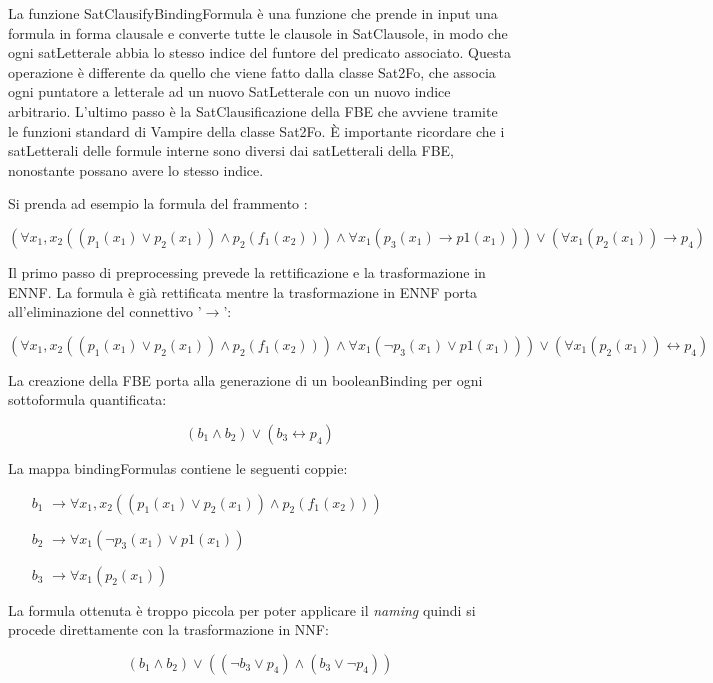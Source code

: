 \documentclass[./main.tex]{subfiles}
\begin{document}
La funzione SatClausifyBindingFormula è una funzione che prende in input una formula
in forma clausale e converte tutte le clausole in SatClausole, in modo che ogni satLetterale abbia lo stesso indice del funtore del predicato associato.
Questa operazione è differente da quello che viene fatto dalla classe Sat2Fo, che associa ogni puntatore a letterale ad un nuovo SatLetterale con un nuovo indice arbitrario.
L'ultimo passo è la SatClausificazione della FBE che avviene tramite le funzioni standard di Vampire della classe Sat2Fo.
È importante ricordare che i satLetterali delle formule interne sono diversi dai satLetterali della FBE, nonostante possano avere
lo stesso indice.

Si prenda ad esempio la formula del frammento \cb:

$$ (\forall x_1, x_2 ((p_1(x_1) \lor p_2(x_1)) \land p_2(f_1(x_2))) 
\land  \forall x_1 (p_3(x_1) \rightarrow p1(x_1)))  
\lor (\forall x_1(p_2(x_1)) \rightarrow p_4)
$$

Il primo passo di preprocessing prevede la rettificazione e la trasformazione in ENNF.
La formula è già rettificata mentre la trasformazione in ENNF porta all'eliminazione del connettivo '$\rightarrow$':

$$ (\forall x_1, x_2 ((p_1(x_1) \lor p_2(x_1)) \land p_2(f_1(x_2))) 
\land  \forall x_1 (\lnot p_3(x_1) \lor p1(x_1)))  
\lor (\forall x_1(p_2(x_1)) \leftrightarrow p_4)
$$

La creazione della FBE porta alla generazione di un booleanBinding per ogni sottoformula quantificata:

$$ (b_1 
\land  b_2)  
\lor (b_3 \leftrightarrow p_4)
$$

La mappa bindingFormulas contiene le seguenti coppie:

\begin{itemize}
    \item [$b_1$] $\rightarrow \forall x_1, x_2 ((p_1(x_1) \lor p_2(x_1)) \land p_2(f_1(x_2))) $
    \item [$b_2$] $\rightarrow \forall x_1 (\lnot p_3(x_1) \lor p1(x_1))$
    \item [$b_3$] $\rightarrow \forall x_1(p_2(x_1))$
\end{itemize}

La formula ottenuta è troppo piccola per poter applicare il \textit{naming}
quindi si procede direttamente con la trasformazione in NNF:

$$ (b_1 
\land  b_2)  
\lor ((\lnot b_3 \lor p_4) \land (b_3 \lor \lnot p_4))
$$
\end{document}
